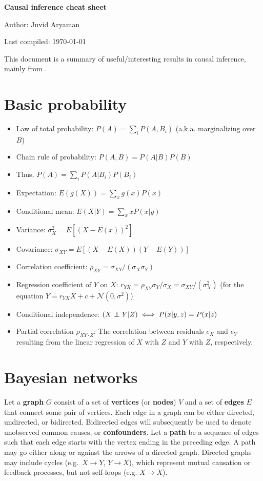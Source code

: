 \documentclass[11pt]{article}
\numberwithin{equation}{section}
\newcommand\indep{\protect\mathpalette{\protect\independenT}{\perp}}
\def\independenT#1#2{\mathrel{\rlap{$#1#2$}\mkern2mu{#1#2}}}
\begin{document}
\begin{flushleft}
\textbf{\Large Causal inference cheat sheet}
\end{flushleft}

\begin{flushleft}
Author: Juvid Aryaman

Last compiled: \today
\end{flushleft}

\noindent This document is a summary of useful/interesting results in causal inference, mainly from \cite{pearl09}.


\section{Basic probability}

\begin{itemize}[noitemsep]
\item Law of total probability: $P(A) = \sum_i P(A, B_i)$ (a.k.a. marginalizing over $B$)
\item Chain rule of probability: $P(A,B) = P(A|B) P(B)$
\item Thus, $P(A) = \sum_i P(A|B_i) P(B_i)$
\item Expectation: $E(g(X)) = \sum_x g(x) P(x)$
\item Conditional mean: $E(X|Y) = \sum_x x P(x|y)$
\item Variance: $\sigma_X^2 = E[(X - E(x))^2]$
\item Covariance: $\sigma_{XY} = E[(X-E(X))(Y-E(Y))]$
\item Correlation coefficient: $\rho_{XY}=\sigma_{XY}/(\sigma_X \sigma_Y)$
\item Regression coefficient of $Y$ on $X$: $r_{YX} = \rho_{XY} \sigma_Y/\sigma_X = \sigma_{XY}/(\sigma_X^2)$ (for the equation $Y = r_{YX} X + c + \mathcal{N}(0, \sigma^2)$)
\item Conditional independence: $(X \indep Y | Z) \iff P(x|y,z) = P(x|z) $
\item Partial correlation $\rho_{XY\cdot Z}$: The correlation between residuals $e_X$ and $e_Y$ resulting from the linear regression of $X$ with $Z$ and $Y$ with $Z$, respectively.
\end{itemize}


\section{Bayesian networks}
Let a \textbf{graph} $G$ consist of a set of \textbf{vertices} (or \textbf{nodes}) $V$ and a set of \textbf{edges} $E$ that connect some pair of vertices. Each edge in a graph can be either directed, undirected, or bidirected. Bidirected edges will subsequently be used to denote unobserved common causes, or \textbf{confounders}. Let a \textbf{path} be a sequence of edges such that each edge starts with the vertex ending in the preceding edge. A path may go either along or against the arrows of a directed graph. Directed graphs may include cycles (e.g.\ $X \rightarrow Y$, $Y \rightarrow X$), which represent mutual causation or feedback processes, but not self-loops (e.g. $X \rightarrow X$).
\end{document}
